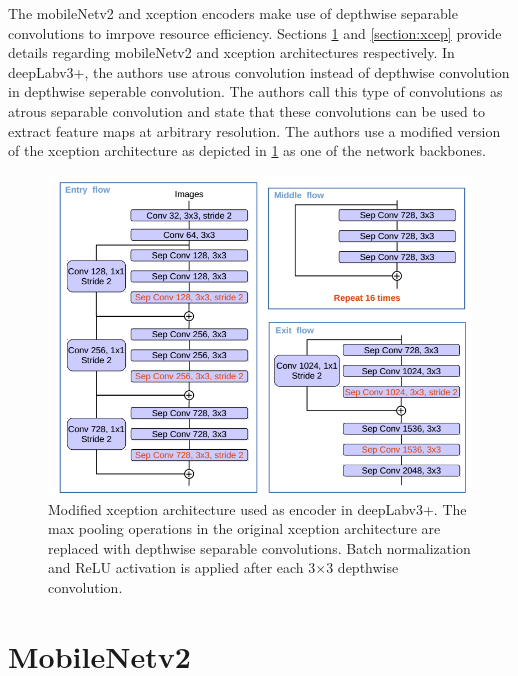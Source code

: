 The mobileNetv2 and xception encoders make use of depthwise separable convolutions to imrpove resource efficiency. Sections \ref{section:mn} and \ref{section:xcep} provide details regarding mobileNetv2 and xception architectures respectively. In deepLabv3+, the authors use atrous convolution instead of depthwise convolution in depthwise seperable convolution. The authors call this type of convolutions as atrous separable convolution and state that these convolutions can be used to extract feature maps at arbitrary resolution. The authors use a modified version of the xception architecture as depicted in \ref{Fig:deepLabv4_xcep} as one of the network backbones.

	\begin{figure}[!htb]
		\centering
		\includegraphics[width=.8\linewidth]{images/deepLabv4_xcep}
		\caption{Modified xception architecture used as encoder in deepLabv3+. The max pooling operations in the original xception architecture are replaced with depthwise separable convolutions. Batch normalization and ReLU activation is applied after each 3$\times$3 depthwise convolution.}
		\label{Fig:deepLabv4_xcep}
	\end{figure}

\section{MobileNetv2}
\label{section:mn}




